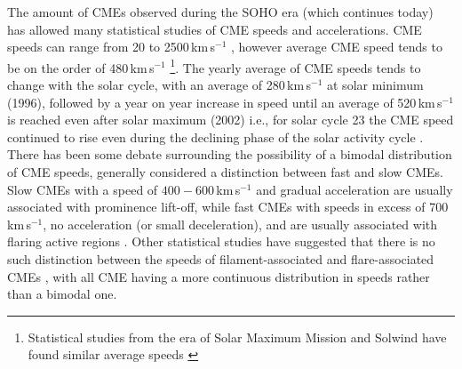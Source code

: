 The amount of CMEs observed during the SOHO era (which continues today) has allowed many statistical studies of CME speeds and accelerations. CME speeds can range from 20 to 2500\,km\,s$^{-1}$ \citep{gopal2004}, however average CME speed tends to be on the order of 480\,km\,s$^{-1}$ \citep{yurch2005, webb2012}\footnote{Statistical studies from the era of Solar Maximum Mission and Solwind have found similar average speeds \citep{burk2004}}. The yearly average of CME speeds tends to change with the solar cycle, with an average of 280\,km\,s$^{-1}$ at solar minimum (1996), followed by a year on year increase in speed until an average of 520\,km\,s$^{-1}$ is reached even after solar maximum (2002) i.e., for solar cycle 23 the CME speed continued to rise even during the declining phase of the solar activity cycle \citep{yashiro2004}. There has been some debate surrounding the possibility of a bimodal distribution of CME speeds, generally considered a distinction between fast and slow CMEs. Slow CMEs with a speed of $400-600$\,km\,s$^{-1}$ and gradual acceleration are usually associated with prominence lift-off, while fast CMEs with speeds in excess of 700\,km\,s$^{-1}$, no acceleration (or small deceleration), and are usually associated with flaring active regions \citep{shee1999, gopal2004, moon2000}. Other statistical studies have suggested that there is no such distinction between the speeds of filament-associated and flare-associated CMEs \citep{vrsna2005, yurch2005}, with all CME having a more continuous distribution in speeds rather than a bimodal one. 
